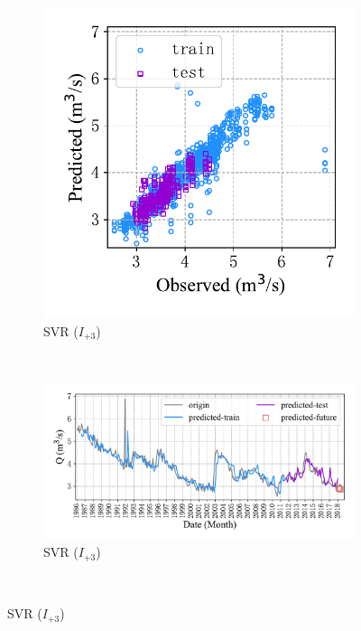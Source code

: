 \begin{figure}[!htbp]
  \begin{subfigure}[b]{0.305\textwidth}
    \includegraphics[width=\textwidth]{Img/chap4_spr/out4/spr_scatter_in_3_out_4_svr.pdf}
    \vspace{-1.2cm}
    \caption{SVR ($I_{+3}$)}
    \label{fig:spr_scatter_in_3_out_4_svr}
  \end{subfigure}
  ~
  \begin{subfigure}[b]{0.615\textwidth}
    \includegraphics[width=\textwidth]{Img/chap4_spr/out4/spr_series_in_3_out_4_svr.pdf}
    \vspace{-1.2cm}
    \caption{SVR ($I_{+3}$)}
    \label{fig:spr_series_in_3_out_4_svr}
  \end{subfigure}
  \\

\end{figure}
